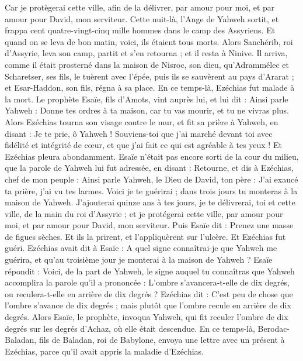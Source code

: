 \begin{multicols}{2}
Car je protègerai cette ville, afin de la délivrer, par amour pour moi, et par amour pour David, mon serviteur.
Cette nuit-là, l’Ange de Yahweh\FTNT{} sortit, et frappa cent quatre-vingt-cinq mille hommes dans le camp des Assyriens. Et quand on se leva de bon matin, voici, ils étaient tous morts.
Alors Sanchérib, roi d’Assyrie, leva son camp, partit et s’en retourna ; et il resta à Ninive.
Il arriva, comme il était prosterné dans la maison de Nisroc, son dieu, qu’Adrammélec et Scharetser, ses fils, le tuèrent avec l’épée, puis ils se sauvèrent au pays d’Ararat ; et Esar-Haddon, son fils, régna à sa place.
\VerseOne{}En ce temps-là, Ezéchias fut malade à la mort. Le prophète Esaïe, fils d’Amots, vint auprès lui, et lui dit : Ainsi parle Yahweh : Donne tes ordres à ta maison, car tu vas mourir, et tu ne vivras plus.
Alors Ezéchias tourna son visage contre le mur, et fit sa prière à Yahweh, en disant :
Je te prie, ô Yahweh ! Souviens-toi que j’ai marché devant toi avec fidélité et intégrité de cœur, et que j’ai fait ce qui est agréable à tes yeux ! Et Ezéchias pleura abondamment.
Esaïe n’était pas encore sorti de la cour du milieu, que la parole de Yahweh lui fut adressée, en disant :
Retourne, et dis à Ezéchias, chef de mon peuple : Ainsi parle Yahweh, le Dieu de David, ton père : J’ai exaucé ta prière, j’ai vu tes larmes. Voici je te guérirai ; dans trois jours tu monteras à la maison de Yahweh.
J’ajouterai quinze ans à tes jours, je te délivrerai, toi et cette ville, de la main du roi d’Assyrie ; et je protégerai cette ville, par amour pour moi, et par amour pour David, mon serviteur.
Puis Esaïe dit : Prenez une masse de figues sèches. Et ils la prirent, et l’appliquèrent sur l’ulcère. Et Ezéchias fut guéri.
Ezéchias avait dit à Esaïe : A quel signe connaîtrai-je que Yahweh me guérira, et qu’au troisième jour je monterai à la maison de Yahweh ?
Esaïe répondit : Voici, de la part de Yahweh, le signe auquel tu connaîtras que Yahweh accomplira la parole qu’il a prononcée : L’ombre s’avancera-t-elle de dix degrés, ou reculera-t-elle en arrière de dix degrés ?
Ezéchias dit : C’est peu de chose que l’ombre s’avance de dix degrés ; mais plutôt que l’ombre recule en arrière de dix degrés.
Alors Esaïe, le prophète, invoqua Yahweh, qui fit reculer l’ombre de dix degrés sur les degrés d’Achaz, où elle était descendue.
En ce temps-là, Berodac-Baladan, fils de Baladan, roi de Babylone, envoya une lettre avec un présent à Ezéchias, parce qu’il avait appris la maladie d’Ezéchias.

\end{multicols}
